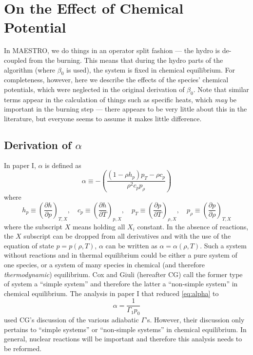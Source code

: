 \section{On the Effect of Chemical Potential}
\label{Sec:On the Affect of Chemical Potential}

In MAESTRO, we do things in an operator split fashion --- the hydro is
de-coupled from the burning.  This means that during the hydro parts
of the algorithm (where $\beta_0$ is used), the system is fixed in
chemical equilibrium. For completeness, however, here we describe the
effects of the species' chemical potentials, which were neglected in
the original derivation of $\beta_0$.  Note that similar terms appear
in the calculation of things such as specific heats,
which \textit{may} be important in the burning step --- there appears to
be very little about this in the literature, but everyone seems to
assume it makes little difference.

\subsection{Derivation of $\alpha$}
\label{Sec:Derivation of alpha}
In paper I, $\alpha$ is defined as
\begin{equation}\label{eq:alpha}
\alpha\equiv -\left(
\frac{(1-\rho h_p)p_T-\rho c_p}{\rho^2c_pp_\rho}\right)
\end{equation}
where 
\[
h_p \equiv \left(\frac{\partial h}{\partial p}\right)_{T,X}, \quad
c_p \equiv \left(\frac{\partial h}{\partial T}\right)_{p,X}, \quad
p_T \equiv \left(\frac{\partial p}{\partial T}\right)_{\rho,X}, \quad
p_\rho \equiv \left(\frac{\partial p}{\partial \rho}\right)_{T,X}
\]
where the subscript $X$ means holding all $X_i$ constant.  In the
absence of reactions, the $X$ subscript can be dropped from all
derivatives and with the use of the equation of state $p=p(\rho,T)$,
$\alpha$ can be written as $\alpha=\alpha(\rho,T)$.  Such a system
without reactions and in thermal equilibrium could be either a pure
system of one species, or a system of many species in chemical (and
therefore \emph{thermodynamic}) equilibrium.  Cox and Giuli (hereafter
CG) call the former type of system a ``simple system'' and therefore
the latter a ``non-simple system'' in chemical equilibrium.  The
analysis in paper I that reduced \eqref{eq:alpha} to
\begin{equation}\label{eq:alpha_simp_no_rxn} 
\alpha = \frac{1}{\Gamma_1p_0} 
\end{equation} 
used CG's discussion of the various adiabatic $\Gamma$'s.  However,
their discussion only pertains to ``simple systems'' or ``non-simple
systems'' in chemical equilibrium.  In general, nuclear reactions will
be important and therefore this analysis needs to be reformed.


